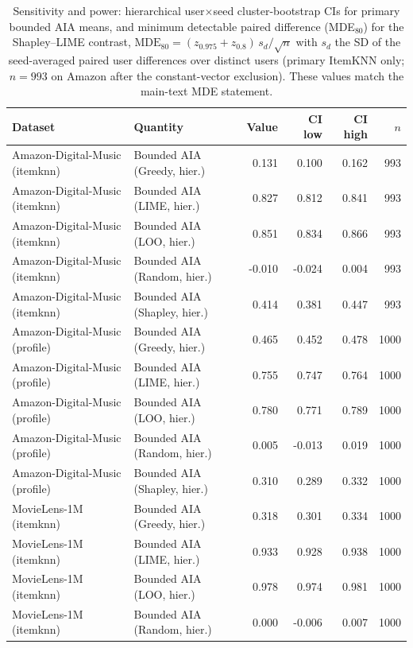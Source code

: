 \begin{table}[t]\centering\scriptsize\setlength{\tabcolsep}{3pt}
\caption{Sensitivity and power: hierarchical user$\times$seed cluster-bootstrap
CIs for primary bounded AIA means, and minimum detectable paired difference
(MDE$_{80}$) for the Shapley--LIME contrast, $\mathrm{MDE}_{80}=(z_{0.975}+z_{0.8})\,s_d/\sqrt{n}$
with $s_d$ the SD of the seed-averaged paired user differences over distinct
users (primary ItemKNN only; $n=993$ on Amazon after the constant-vector
exclusion). These values match the main-text MDE statement.}
\label{tab:sens-power}
\begin{tabular}{@{}llrrrr@{}}
\toprule
Dataset & Quantity & Value & CI low & CI high & $n$ \\
\midrule
Amazon-Digital-Music (itemknn) & Bounded AIA (Greedy, hier.) & 0.131 & 0.100 & 0.162 & 993 \\
Amazon-Digital-Music (itemknn) & Bounded AIA (LIME, hier.) & 0.827 & 0.812 & 0.841 & 993 \\
Amazon-Digital-Music (itemknn) & Bounded AIA (LOO, hier.) & 0.851 & 0.834 & 0.866 & 993 \\
Amazon-Digital-Music (itemknn) & Bounded AIA (Random, hier.) & -0.010 & -0.024 & 0.004 & 993 \\
Amazon-Digital-Music (itemknn) & Bounded AIA (Shapley, hier.) & 0.414 & 0.381 & 0.447 & 993 \\
Amazon-Digital-Music (profile) & Bounded AIA (Greedy, hier.) & 0.465 & 0.452 & 0.478 & 1000 \\
Amazon-Digital-Music (profile) & Bounded AIA (LIME, hier.) & 0.755 & 0.747 & 0.764 & 1000 \\
Amazon-Digital-Music (profile) & Bounded AIA (LOO, hier.) & 0.780 & 0.771 & 0.789 & 1000 \\
Amazon-Digital-Music (profile) & Bounded AIA (Random, hier.) & 0.005 & -0.013 & 0.019 & 1000 \\
Amazon-Digital-Music (profile) & Bounded AIA (Shapley, hier.) & 0.310 & 0.289 & 0.332 & 1000 \\
MovieLens-1M (itemknn) & Bounded AIA (Greedy, hier.) & 0.318 & 0.301 & 0.334 & 1000 \\
MovieLens-1M (itemknn) & Bounded AIA (LIME, hier.) & 0.933 & 0.928 & 0.938 & 1000 \\
MovieLens-1M (itemknn) & Bounded AIA (LOO, hier.) & 0.978 & 0.974 & 0.981 & 1000 \\
MovieLens-1M (itemknn) & Bounded AIA (Random, hier.) & 0.000 & -0.006 & 0.007 & 1000 \\

\end{tabular}
\end{table}
